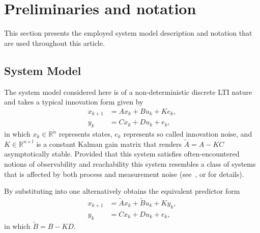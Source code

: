 \section{Preliminaries and notation}
This section presents the employed system model description and notation that are used throughout this article.

\subsection{System Model}
The system model considered here is of a non-deterministic discrete \ac{LTI} nature and takes a typical innovation form given by
\begin{subequations}\label{eqn:SS_innovation1}
\begin{align}
	x_{k+1} &= Ax_k + Bu_k + Ke_k,\label{eqn:SSi_x}\\
	y_k &= Cx_k + Du_k + e_k \label{eqn:SSi_y},
\end{align}
\end{subequations}
in which $x_k\in\mathbb{R}^{n}$ represents states, $e_k$ represents so called innovation noise, and $K\in\mathbb{R}^{n\times l}$ is a constant Kalman gain matrix that renders ${\tilde{A}=A-KC}$ asymptotically stable. Provided that this system satisfies often-encountered notions of observability and reachability this system resembles a class of systems that is affected by both process and measurement noise (see~\cite[p.~112-113]{Anderson1979}, or \cite[p.~162]{Verhaegen2007a} for details).

By substituting  into  one alternatively obtains the equivalent predictor form
\begin{subequations}\label{eqn:SS_predictor1}
\begin{align}
	x_{k+1} &= \tilde{A}x_k + \tilde{B}u_k + Ky_k,\label{eqn:SSp_x}\\
	y_k &= Cx_k + Du_k + e_k \label{eqn:SSp_y},
\end{align}
\end{subequations}
in which $\tilde{B}=B-KD$.

